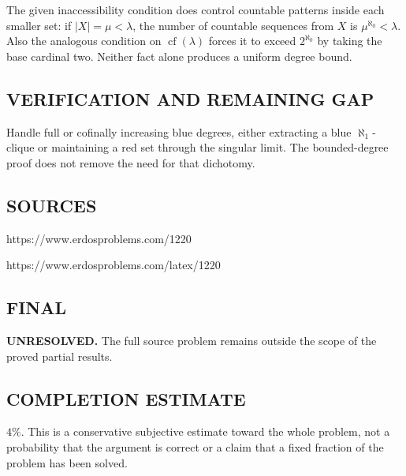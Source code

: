 The given inaccessibility condition does control countable patterns inside
each smaller set: if $|X|=\mu<\lambda$, the number of countable sequences from
$X$ is $\mu^{\aleph_0}<\lambda$. Also the analogous condition on
$\operatorname{cf}(\lambda)$ forces it to exceed $2^{\aleph_0}$ by taking
the base cardinal two. Neither fact alone produces a uniform degree bound.

\subsection*{VERIFICATION AND REMAINING GAP}
Handle full or cofinally increasing blue degrees, either extracting a blue
$\aleph_1$-clique or maintaining a red set through the singular limit. The
bounded-degree proof does not remove the need for that dichotomy.

\subsection*{SOURCES}
https://www.erdosproblems.com/1220

https://www.erdosproblems.com/latex/1220

\subsection*{FINAL}
\textbf{UNRESOLVED.} The full source problem remains outside the scope of the proved partial results.

\subsection*{COMPLETION ESTIMATE}
$4\%$. This is a conservative subjective estimate toward the whole problem, not a probability that the argument is correct or a claim that a fixed fraction of the problem has been solved.
